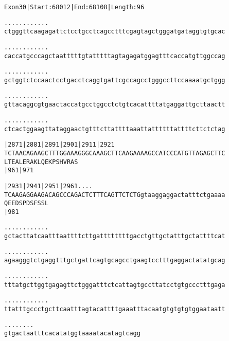 \documentclass{article}
\begin{document}
\newpage
\begin{alltt}
Exon 30 | Start: 68012 | End: 68108 | Length: 96

.    .    .    .    .    .    .    .    .    .    .    .
ctgggttcaagagattctcctgcctcagcctttcgagtagctgggatgataggtgtgcac



.    .    .    .    .    .    .    .    .    .    .    .
caccatgcccagctaatttttgtatttttagtagagatggagtttcaccatgttggccag



.    .    .    .    .    .    .    .    .    .    .    .
gctggtctccaactcctgacctcaggtgattcgccagcctgggccttccaaaatgctggg



.    .    .    .    .    .    .    .    .    .    .    .
gttacaggcgtgaactaccatgcctggcctctgtcacattttatgaggattgcttaactt



.    .    .    .    .    .    .    .    .    .    .    .
ctcactggaagttataggaactgtttcttattttaaattattttttattttcttctctag



   |2871     |2881     |2891     |2901     |2911     |2921
TCTAACAGAAGCTTTGGAAAGGGCAAAGCTTCAAGAAAAGCCATCCCATGTTAGAGCTTC
 L  T  E  A  L  E  R  A  K  L  Q  E  K  P  S  H  V  R  A  S
             |961                          |971

   |2931     |2941     |2951     |2961   .    .    .    .
TCAAGAGGAAGACAGCCCAGACTCTTTCAGTTCTCTGgtaaggaggactatttctgaaaa
 Q  E  E  D  S  P  D  S  F  S  S  L
             |981

 .    .    .    .    .    .    .    .    .    .    .    .
gctacttatcaatttaattttcttgattttttttgacctgttgctatttgctattttcat



\end{alltt}
\newpage
\begin{alltt}
 .    .    .    .    .    .    .    .    .    .    .    .
agaagggtctgaggtttgctgattcagtgcagcctgaagtcctttgaggactatatgcag



 .    .    .    .    .    .    .    .    .    .    .    .
tttatgcttggtgagagttctgggatttctcattagtgccttatcctgtgccctttgaga



 .    .    .    .    .    .    .    .    .    .    .    .
ttatttgccctgcttcaatttagtacattttgaaatttacaatgtgtgtgtggaataatt



 .    .    .    .    .    .    .    .
gtgactaatttcacatatggtaaaatacatagtcagg


\end{alltt}
\end{document}
